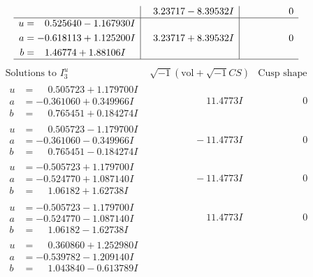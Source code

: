 \documentclass[1p]{elsarticle_modified}
\theoremstyle{definition}
\newcommand{\I}{\sqrt{-1}}
\begin{document}
$$\begin{array}{c|c|c}
 & \phantom{-}3.23717 - 8.39532 I & \phantom{-0.000000 } 0 \\ \hline\begin{aligned}
u &= \phantom{-}0.525640 - 1.167930 I \\
a &= -0.618113 + 1.125200 I \\
b &= \phantom{-}1.46774 + 1.88106 I\end{aligned}
 & \phantom{-}3.23717 + 8.39532 I & \phantom{-0.000000 } 0\\
 \hline 
 \end{array}$$\newpage$$\begin{array}{c|c|c}  
\text{Solutions to }I^u_{3}& \I (\text{vol} + \sqrt{-1}CS) & \text{Cusp shape}\\
 \hline 
\begin{aligned}
u &= \phantom{-}0.505723 + 1.179700 I \\
a &= -0.361060 + 0.349966 I \\
b &= \phantom{-}0.765451 + 0.184274 I\end{aligned}
 & \phantom{-0.000000 -}11.4773 I & \phantom{-0.000000 } 0 \\ \hline\begin{aligned}
u &= \phantom{-}0.505723 - 1.179700 I \\
a &= -0.361060 - 0.349966 I \\
b &= \phantom{-}0.765451 - 0.184274 I\end{aligned}
 & \phantom{-0.000000 } -11.4773 I & \phantom{-0.000000 } 0 \\ \hline\begin{aligned}
u &= -0.505723 + 1.179700 I \\
a &= -0.524770 + 1.087140 I \\
b &= \phantom{-}1.06182 + 1.62738 I\end{aligned}
 & \phantom{-0.000000 } -11.4773 I & \phantom{-0.000000 } 0 \\ \hline\begin{aligned}
u &= -0.505723 - 1.179700 I \\
a &= -0.524770 - 1.087140 I \\
b &= \phantom{-}1.06182 - 1.62738 I\end{aligned}
 & \phantom{-0.000000 -}11.4773 I & \phantom{-0.000000 } 0 \\ \hline\begin{aligned}
u &= \phantom{-}0.360860 + 1.252980 I \\
a &= -0.539782 - 1.209140 I \\
b &= \phantom{-}1.043840 - 0.613789 I\end{aligned}

\end{array}$$
\end{document}
